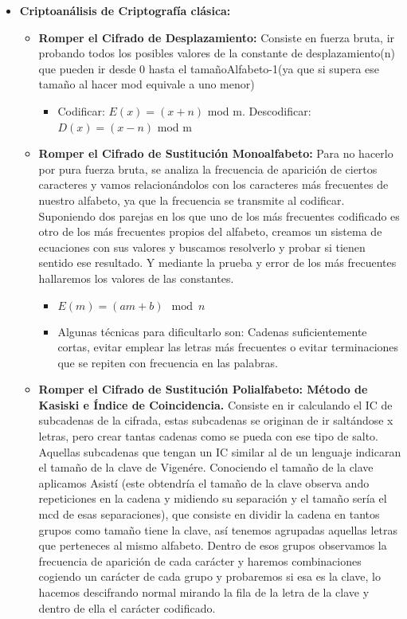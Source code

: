 \documentclass[12pt, twoside, openright]{report} %
\begin{document}
\begin{itemize}
\begin{itemize}
\begin{itemize}
		            \end{itemize}
	      \end{itemize}
	\item \textbf{Criptoanálisis de Criptografía clásica:}
	      \begin{itemize}
		      \item \textbf{Romper el Cifrado de Desplazamiento:} Consiste en fuerza bruta, ir probando todos los posibles valores de la constante de desplazamiento(n) que pueden ir desde 0 hasta el tamañoAlfabeto-1(ya que si supera ese tamaño al hacer mod equivale a uno menor)
		            \begin{itemize}
			            \item Codificar: $E(x)=(x+n)$ mod m. Descodificar: $D(x)=(x-n)$ mod m
		            \end{itemize}
		      \item \textbf{Romper el Cifrado de Sustitución Monoalfabeto:} Para no hacerlo por pura fuerza bruta, se analiza la frecuencia de aparición de ciertos caracteres y vamos relacionándolos con los caracteres más frecuentes de nuestro alfabeto, ya que la frecuencia se transmite al codificar. Suponiendo dos parejas en los que uno de los más frecuentes codificado es otro de los más frecuentes propios del alfabeto, creamos un sistema de ecuaciones con sus valores y buscamos resolverlo y probar si tienen sentido ese resultado. Y mediante la prueba y error de los más frecuentes hallaremos los valores de las constantes.
		            \begin{itemize}
			            \item $E(m)=(am+b) \mod n$
			            \item Algunas técnicas para dificultarlo son: Cadenas suficientemente cortas, evitar emplear las letras más frecuentes o evitar terminaciones que se repiten con frecuencia en las palabras.
		            \end{itemize}
		      \item \textbf{Romper el Cifrado de Sustitución Polialfabeto: Método de Kasiski e Índice de Coincidencia.}  Consiste en ir calculando el IC de subcadenas de la cifrada, estas subcadenas se originan de ir saltándose x letras, pero crear tantas cadenas como se pueda con ese tipo de salto. Aquellas subcadenas que tengan un IC similar al de un lenguaje indicaran el tamaño de la clave de Vigenére. Conociendo el tamaño de la clave aplicamos Asistí (este obtendría el tamaño de la clave observa ando repeticiones en la cadena y midiendo su separación y el tamaño sería el mcd de esas separaciones), que consiste en dividir la cadena en tantos grupos como tamaño tiene la clave, así tenemos agrupadas aquellas letras que perteneces al mismo alfabeto. Dentro de esos grupos observamos la frecuencia de aparición de cada carácter y haremos combinaciones cogiendo un carácter de cada grupo y probaremos si esa es la clave, lo hacemos descifrando normal mirando la fila de la letra de la clave y dentro de ella el carácter codificado.

\end{itemize}
\end{itemize}
\end{document}
